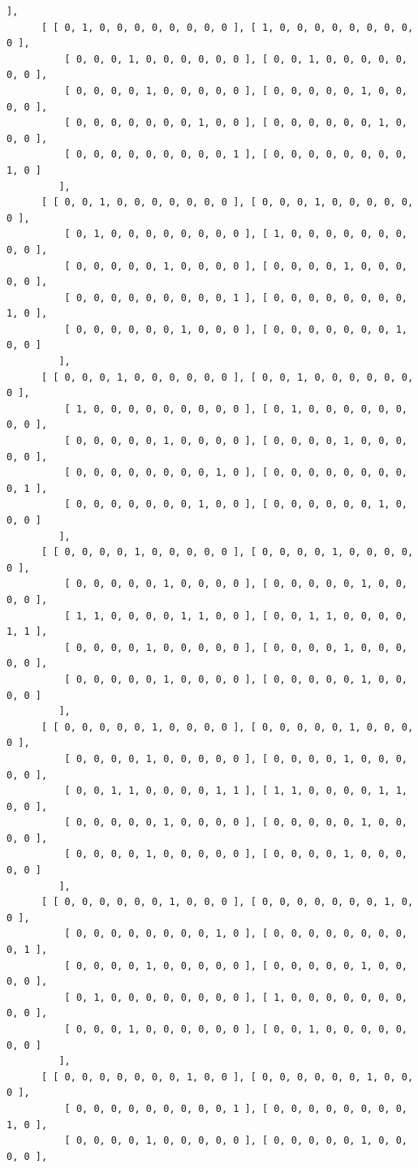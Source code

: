 \documentclass[a4paper, 10pt]{book}
\theoremstyle{definition}
\numberwithin{equation}{chapter}
\begin{document}
\begin{appendices}
\begin{enumerate}
\begin{lstlisting}[numbers=none]
         ], 
      [ [ 0, 1, 0, 0, 0, 0, 0, 0, 0, 0 ], [ 1, 0, 0, 0, 0, 0, 0, 0, 0, 0 ], 
          [ 0, 0, 0, 1, 0, 0, 0, 0, 0, 0 ], [ 0, 0, 1, 0, 0, 0, 0, 0, 0, 0 ],
          [ 0, 0, 0, 0, 1, 0, 0, 0, 0, 0 ], [ 0, 0, 0, 0, 0, 1, 0, 0, 0, 0 ],
          [ 0, 0, 0, 0, 0, 0, 0, 1, 0, 0 ], [ 0, 0, 0, 0, 0, 0, 1, 0, 0, 0 ],
          [ 0, 0, 0, 0, 0, 0, 0, 0, 0, 1 ], [ 0, 0, 0, 0, 0, 0, 0, 0, 1, 0 ] 
         ], 
      [ [ 0, 0, 1, 0, 0, 0, 0, 0, 0, 0 ], [ 0, 0, 0, 1, 0, 0, 0, 0, 0, 0 ], 
          [ 0, 1, 0, 0, 0, 0, 0, 0, 0, 0 ], [ 1, 0, 0, 0, 0, 0, 0, 0, 0, 0 ],
          [ 0, 0, 0, 0, 0, 1, 0, 0, 0, 0 ], [ 0, 0, 0, 0, 1, 0, 0, 0, 0, 0 ],
          [ 0, 0, 0, 0, 0, 0, 0, 0, 0, 1 ], [ 0, 0, 0, 0, 0, 0, 0, 0, 1, 0 ],
          [ 0, 0, 0, 0, 0, 0, 1, 0, 0, 0 ], [ 0, 0, 0, 0, 0, 0, 0, 1, 0, 0 ] 
         ], 
      [ [ 0, 0, 0, 1, 0, 0, 0, 0, 0, 0 ], [ 0, 0, 1, 0, 0, 0, 0, 0, 0, 0 ], 
          [ 1, 0, 0, 0, 0, 0, 0, 0, 0, 0 ], [ 0, 1, 0, 0, 0, 0, 0, 0, 0, 0 ],
          [ 0, 0, 0, 0, 0, 1, 0, 0, 0, 0 ], [ 0, 0, 0, 0, 1, 0, 0, 0, 0, 0 ],
          [ 0, 0, 0, 0, 0, 0, 0, 0, 1, 0 ], [ 0, 0, 0, 0, 0, 0, 0, 0, 0, 1 ],
          [ 0, 0, 0, 0, 0, 0, 0, 1, 0, 0 ], [ 0, 0, 0, 0, 0, 0, 1, 0, 0, 0 ] 
         ], 
      [ [ 0, 0, 0, 0, 1, 0, 0, 0, 0, 0 ], [ 0, 0, 0, 0, 1, 0, 0, 0, 0, 0 ], 
          [ 0, 0, 0, 0, 0, 1, 0, 0, 0, 0 ], [ 0, 0, 0, 0, 0, 1, 0, 0, 0, 0 ],
          [ 1, 1, 0, 0, 0, 0, 1, 1, 0, 0 ], [ 0, 0, 1, 1, 0, 0, 0, 0, 1, 1 ],
          [ 0, 0, 0, 0, 1, 0, 0, 0, 0, 0 ], [ 0, 0, 0, 0, 1, 0, 0, 0, 0, 0 ],
          [ 0, 0, 0, 0, 0, 1, 0, 0, 0, 0 ], [ 0, 0, 0, 0, 0, 1, 0, 0, 0, 0 ] 
         ], 
      [ [ 0, 0, 0, 0, 0, 1, 0, 0, 0, 0 ], [ 0, 0, 0, 0, 0, 1, 0, 0, 0, 0 ], 
          [ 0, 0, 0, 0, 1, 0, 0, 0, 0, 0 ], [ 0, 0, 0, 0, 1, 0, 0, 0, 0, 0 ],
          [ 0, 0, 1, 1, 0, 0, 0, 0, 1, 1 ], [ 1, 1, 0, 0, 0, 0, 1, 1, 0, 0 ],
          [ 0, 0, 0, 0, 0, 1, 0, 0, 0, 0 ], [ 0, 0, 0, 0, 0, 1, 0, 0, 0, 0 ],
          [ 0, 0, 0, 0, 1, 0, 0, 0, 0, 0 ], [ 0, 0, 0, 0, 1, 0, 0, 0, 0, 0 ] 
         ], 
      [ [ 0, 0, 0, 0, 0, 0, 1, 0, 0, 0 ], [ 0, 0, 0, 0, 0, 0, 0, 1, 0, 0 ], 
          [ 0, 0, 0, 0, 0, 0, 0, 0, 1, 0 ], [ 0, 0, 0, 0, 0, 0, 0, 0, 0, 1 ],
          [ 0, 0, 0, 0, 1, 0, 0, 0, 0, 0 ], [ 0, 0, 0, 0, 0, 1, 0, 0, 0, 0 ],
          [ 0, 1, 0, 0, 0, 0, 0, 0, 0, 0 ], [ 1, 0, 0, 0, 0, 0, 0, 0, 0, 0 ],
          [ 0, 0, 0, 1, 0, 0, 0, 0, 0, 0 ], [ 0, 0, 1, 0, 0, 0, 0, 0, 0, 0 ] 
         ], 
      [ [ 0, 0, 0, 0, 0, 0, 0, 1, 0, 0 ], [ 0, 0, 0, 0, 0, 0, 1, 0, 0, 0 ], 
          [ 0, 0, 0, 0, 0, 0, 0, 0, 0, 1 ], [ 0, 0, 0, 0, 0, 0, 0, 0, 1, 0 ],
          [ 0, 0, 0, 0, 1, 0, 0, 0, 0, 0 ], [ 0, 0, 0, 0, 0, 1, 0, 0, 0, 0 ],

\end{lstlisting}
\end{enumerate}
\end{appendices}
\end{document}
